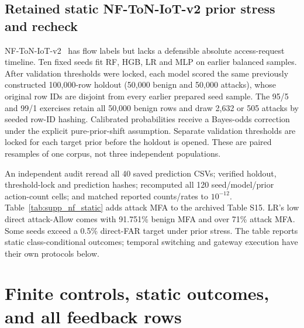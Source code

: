 \documentclass[10pt,onecolumn]{IEEEtran}
\begin{document}
\subsection{Retained static NF-ToN-IoT-v2 prior stress and recheck}
NF-ToN-IoT-v2~\cite{nf_v2} has flow labels but lacks a defensible
absolute access-request timeline. Ten fixed seeds fit
RF, HGB, LR and MLP on earlier balanced samples.
After validation thresholds were locked, each model
scored the same previously constructed 100,000-row holdout
(50,000 benign and 50,000 attacks), whose original
row IDs are disjoint from every earlier prepared seed
sample. The 95/5 and 99/1 exercises retain all
50,000 benign rows and draw 2,632 or 505 attacks
by seeded row-ID hashing. Calibrated probabilities
receive a Bayes-odds correction under the explicit
pure-prior-shift assumption. Separate validation
thresholds are locked for each target prior before
the holdout is opened. These are paired resamples of
one corpus, not three independent populations.

An independent audit reread all 40 saved prediction
CSVs; verified holdout, threshold-lock and prediction
hashes; recomputed all 120 seed/model/prior action-count
cells; and matched reported counts/rates to
\(10^{-12}\). Table~\ref{tab:supp_nf_static} adds attack
MFA to the archived Table S15. LR's low direct
attack-Allow comes with 91.751\% benign MFA
and over 71\% attack MFA. Some seeds exceed a
0.5\% direct-FAR target under prior stress.
The table reports static class-conditional outcomes;
temporal switching and gateway execution have their
own protocols below.


\section{Finite controls, static outcomes, and all feedback rows}
\label{sec:supp_results}
\end{document}
